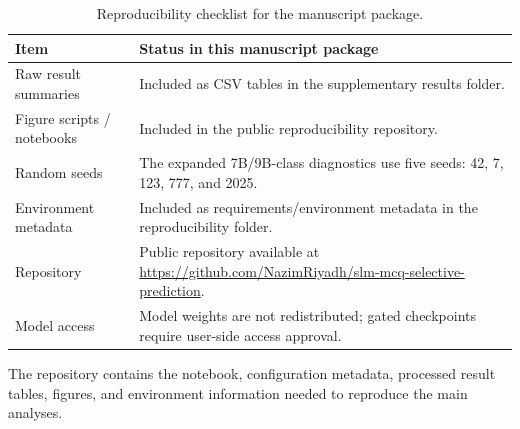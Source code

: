 \begin{table}[t]
\centering
\small
\caption{Reproducibility checklist for the manuscript package.}
\label{tab:reproducibility}
\begin{threeparttable}

\begin{tabular}{p{}p{}}
\toprule
Item & Status in this manuscript package \\
\midrule
Raw result summaries & Included as CSV tables in the supplementary results folder. \\
Figure scripts / notebooks & Included in the public reproducibility repository. \\
Random seeds & The expanded 7B/9B-class diagnostics use five seeds: 42, 7, 123, 777, and 2025. \\
Environment metadata & Included as requirements/environment metadata in the reproducibility folder. \\
Repository & Public repository available at \url{https://github.com/NazimRiyadh/slm-mcq-selective-prediction}. \\
Model access & Model weights are not redistributed; gated checkpoints require user-side access approval. \\
\bottomrule
\end{tabular}

\begin{tablenotes}[flushleft]\footnotesize\item \parbox{0.95\textwidth}{The repository contains the notebook, configuration metadata, processed result tables, figures, and environment information needed to reproduce the main analyses.}\end{tablenotes}
\end{threeparttable}
\end{table}
